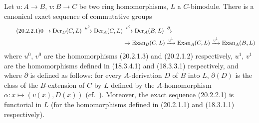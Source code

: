 \begin{theorem}[20.2.2]
\label{0.20.2.2}
Let $u:A\to B$, $v:B\to C$ be two ring homomorphisms, $L$ a $C$-bimodule.
There is a canonical exact sequence of commutative groups
\begin{align}
\tag{20.2.2.1}
  \label{0.20.2.2.1}
  0\to\operatorname{Der}_B(C,L)\xrightarrow{u^0}\operatorname{Der}_A(C,L)&\xrightarrow{v^0}\operatorname{Der}_A(B,L)\xrightarrow{\partial} \\
  &\to\operatorname{Exan}_B(C,L)\xrightarrow{u^1}\operatorname{Exan}_A(C,L)\xrightarrow{v^1}\operatorname{Exan}_A(B,L) \notag
\end{align}
where $u^0$, $v^0$ are the homomorphisms \textup{(}20.2.1.3\textup{)} and \textup{(}20.2.1.2\textup{)} respectively, $u^1$, $v^1$ are the homomorphisms defined in (18.3.4.1) and (18.3.3.1) respectively, and where $\partial$ is defined as follows: for every $A$-derivation $D$ of $B$ into $L$, $\partial(D)$ is the class of the $B$-extension of $C$ by $L$ defined by the $A$-homomorphism $\alpha:x\mapsto(v(x),D(x))$ \textup{(}cf.\ \textup{)}.
Moreover, the exact sequence \textup{(}20.2.2.1\textup{)} is functorial in $L$ \textup{(}for the homomorphisms defined in \textup{(}20.2.1.1\textup{)} and \textup{(}18.3.1.1\textup{)} respectively\textup{)}.
\end{theorem}

